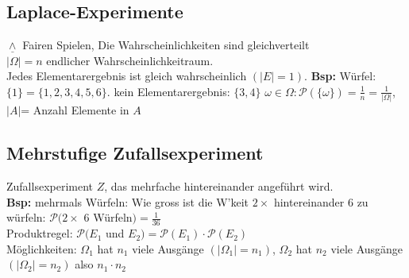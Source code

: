 \documentclass[a4paper,10pt]{article}
\newcommand{\Potp}{\mathcal{P}} %
\newcommand{\Bold}[1]{\textbf{#1}} %
\newcommand{\Abs}[1]{\left| #1 \right|} %
\newcommand{\Oneover}[1]{\frac{1}{#1}} %
\begin{document}
\subsection{Laplace-Experimente}
$\underline{\wedge}$ Fairen Spielen, Die Wahrscheinlichkeiten sind gleichverteilt\\
$\Abs{\Omega}=n$ endlicher Wahrscheinlichkeitraum.\\
Jedes Elementarergebnis ist gleich wahrscheinlich $(\Abs{E}=1)$. \Bold{Bsp:} Würfel: $\{1\}=\{1,2,3,4,5,6\}$. kein Elementarergebnis: $\{3,4\}$
$\omega\in\Omega:\Potp(\{\omega\})=\Oneover{n}=\Oneover{\Abs{\Omega}}$, $\Abs{A}$= Anzahl Elemente in $A$
\subsection{Mehrstufige Zufallsexperiment}
Zufallsexperiment $Z$, das mehrfache hintereinander angeführt wird.\\
\Bold{Bsp:} mehrmals Würfeln: Wie gross ist die W'keit $2\times$ hintereinander 6 zu würfeln: $\Potp(2\times $ 6 Würfeln$)=\Oneover{36}$\\
Produktregel: $\Potp(E_1$ und $E_2)=\Potp(E_1)\cdot \Potp(E_2)$\\
Möglichkeiten: $\Omega_1$ hat $n_1$ viele Ausgänge $(\Abs{\Omega_1}=n_1)$, $\Omega_2$ hat $n_2$ viele Ausgänge $(\Abs{\Omega_2}=n_2)$ also $n_1\cdot n_2$
\end{document}
